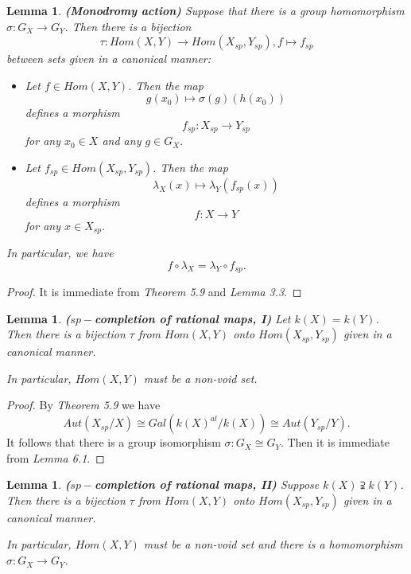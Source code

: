 \documentclass[12pt,twoside,reqno]{amsart}
\newtheorem{lemma}[theorem]{Lemma}
\theoremstyle{definition}
\numberwithin{equation}{section}
\begin{document}
\begin{lemma}
\emph{\textbf{(Monodromy action)}}
Suppose that there is a group homomorphism $\sigma: G_{X} \to G_{Y}$. Then there is a bijection $$\tau :Hom\left( X,Y\right) \to Hom\left( X_{sp},Y_{sp}\right) , f\mapsto f_{sp}$$ between sets given in  a canonical manner:
\begin{itemize}
\item Let $f\in Hom\left( X,Y\right)$. Then the map $$g\left( x_{0}\right)
\longmapsto \sigma \left( g\right) \left( h\left( x_{0}\right) \right) $$
defines a morphism $$f_{sp}:X_{sp}\rightarrow Y_{sp}$$
for any $x_{0}\in X$ and any $g\in G_{X} .$

\item Let $f_{sp}\in Hom\left( X_{sp},Y_{sp}\right)$. Then the map $$
\lambda_{X}\left( x\right) \longmapsto \lambda_{Y}\left( f_{sp}\left( x\right) \right)
$$ defines a morphism $$f:X\rightarrow Y$$ for any $x\in X_{sp}.$
\end{itemize}
In particular, we have $$f\circ \lambda_{X}=\lambda_{Y}\circ f_{sp}.$$
\end{lemma}

\begin{proof}
It is immediate from \emph{Theorem 5.9} and \emph{Lemma 3.3}.
\end{proof}

\begin{lemma}
\emph{\textbf{($sp-$completion of rational maps, I)}} Let $k(X)=k(Y)$. Then there is a bijection $\tau$ from $Hom(X,Y)$ onto $Hom(X_{sp},Y_{sp})$ given in a canonical manner.

 In particular, $Hom(X,Y)$ must be a non-void set.
\end{lemma}

\begin{proof}
By \emph{Theorem 5.9} we have $$Aut(X_{sp}/X)\cong Gal(k(X)^{al}/k(X)) \cong Aut(Y_{sp}/Y).$$ It follows that there is a group isomorphism $\sigma: G_{X}\cong G_{Y}$. Then it is immediate from \emph{Lemma 6.1}.
\end{proof}

\begin{lemma}
\emph{\textbf{($sp-$completion of rational maps, II)}} Suppose $k(X) \supsetneqq k(Y)$. Then there is a bijection $\tau$ from $Hom(X,Y)$ onto $Hom(X_{sp},Y_{sp})$ given in a canonical manner.

In particular, $Hom(X,Y)$ must be a non-void set and there is a homomorphism $\sigma: G_{X}\to G_{Y}$.
\end{lemma}
\end{document}
